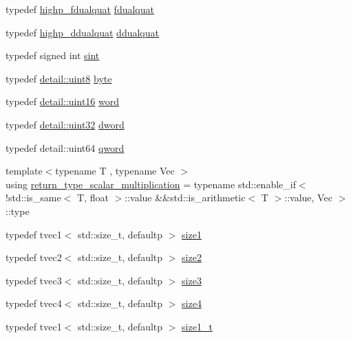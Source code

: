 \begin{DoxyCompactItemize}
\item 
typedef \hyperlink{group__gtx__dual__quaternion_ga8c46d61c38b2b6d9c5091c667dd20fe8}{highp\+\_\+fdualquat} \hyperlink{group__gtx__dual__quaternion_ga436906129bc69ca5059555cafcbac9fd}{fdualquat}
\item 
typedef \hyperlink{group__gtx__dual__quaternion_ga83e4c5d27c8b0a264a3f3aed24f3f84e}{highp\+\_\+ddualquat} \hyperlink{group__gtx__dual__quaternion_ga373431ffdd82d5c03c258217a9e1f1a6}{ddualquat}
\item 
typedef signed int \hyperlink{group__gtx__integer_ga73643e09d8c6d362418aec541fdb987d}{sint}
\item 
typedef \hyperlink{stb__image_8c_adde6aaee8457bee49c2a92621fe22b79}{detail\+::uint8} \hyperlink{group__gtx__raw__data_gacd7fe1f2ad60a57f7d7ad4f1e6836efd}{byte}
\item 
typedef \hyperlink{stb__image_8c_a05f6b0ae8f6a6e135b0e290c25fe0e4e}{detail\+::uint16} \hyperlink{group__gtx__raw__data_ga5617a479d471021b5c773c5e969ba46d}{word}
\item 
typedef \hyperlink{stb__image_8c_a1134b580f8da4de94ca6b1de4d37975e}{detail\+::uint32} \hyperlink{group__gtx__raw__data_ga1fc2589df6d44e923cd1820cf14805cf}{dword}
\item 
typedef detail\+::uint64 \hyperlink{group__gtx__raw__data_ga32447af289e879589883c9b7e3be1246}{qword}
\item 
{\footnotesize template$<$typename T , typename Vec $>$ }\\using \hyperlink{namespaceglm_a68a5dc6ff1dbac4fda02c3b177afa4aa}{return\+\_\+type\+\_\+scalar\+\_\+multiplication} = typename std\+::enable\+\_\+if$<$ !std\+::is\+\_\+same$<$ T, float $>$\+::value \&\&std\+::is\+\_\+arithmetic$<$ T $>$\+::value, Vec $>$\+::type
\item 
typedef tvec1$<$ std\+::size\+\_\+t, defaultp $>$ \hyperlink{group__gtx__std__based__type_ga3550330d27cef40f7694130b501be73a}{size1}
\item 
typedef tvec2$<$ std\+::size\+\_\+t, defaultp $>$ \hyperlink{group__gtx__std__based__type_gab8b434ee2ba109726915e977c6aca22a}{size2}
\item 
typedef tvec3$<$ std\+::size\+\_\+t, defaultp $>$ \hyperlink{group__gtx__std__based__type_gacf3e47fc09ad812f100e13442919fc79}{size3}
\item 
typedef tvec4$<$ std\+::size\+\_\+t, defaultp $>$ \hyperlink{group__gtx__std__based__type_ga66a39603f01a37444de3adb28c021e79}{size4}
\item 
typedef tvec1$<$ std\+::size\+\_\+t, defaultp $>$ \hyperlink{group__gtx__std__based__type_ga9a9525491009d0df7bcc964b1e2e5745}{size1\+\_\+t}

\end{DoxyCompactItemize}
